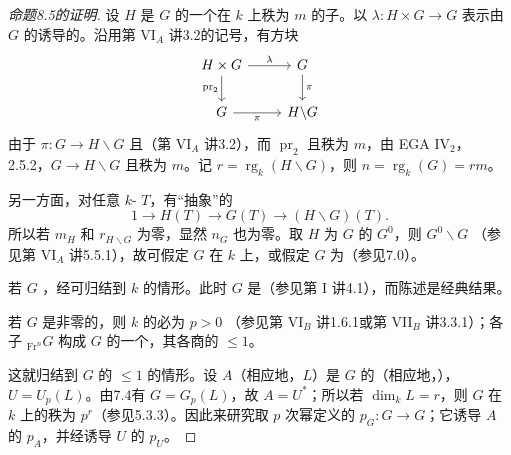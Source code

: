 \begin{proof}[命题8.5的证明]
设 $H$ 是 $G$ 的一个在 $k$ 上秩为 $m$ 的子。以 $\lambda:H\times G\to G$ 表示由 $G$ 的诱导的。沿用第 VI$_A$ 讲3.2的记号，有方块
\[
\begin{tikzcd}
 H\times G\arrow[r,"\lambda"]\arrow[d,"\operatorname{pr}_2"']&G\arrow[d,"\pi"]\\
 G\arrow[r,"\pi"']&H\backslash G
\end{tikzcd}
\]
由于 $\pi:G\to H\backslash G$ 且（第 VI$_A$ 讲3.2），而 $\operatorname{pr}_2$ 且秩为 $m$，由 EGA IV$_2$，2.5.2，$G\to H\backslash G$ 且秩为 $m$。记 $r=\operatorname{rg}_k(H\backslash G)$，则 $n=\operatorname{rg}_k(G)=rm$。

另一方面，对任意 $k$- $T$，有“抽象”的
\[
 1\longrightarrow H(T)\longrightarrow G(T)\longrightarrow(H\backslash G)(T).
\]
所以若 $m_H$ 和 $r_{H\backslash G}$ 为零，显然 $n_G$ 也为零。取 $H$ 为 $G$ 的 $G^0$，则 $G^0\backslash G$ （参见第 VI$_A$ 讲5.5.1），故可假定 $G$ 在 $k$ 上，或假定 $G$ 为（参见7.0）。

若 $G$ ，经可归结到 $k$ 的情形。此时 $G$ 是（参见第 I 讲4.1），而陈述是经典结果。

若 $G$ 是非零的，则 $k$ 的必为 $p>0$
（参见第 VI$_B$ 讲1.6.1或第 VII$_B$ 讲3.3.1）；各子 ${}_{\operatorname{Fr}^n}G$ 构成 $G$ 的一个，其各商的 $\le1$。

这就归结到 $G$ 的 $\le1$ 的情形。设 $A$（相应地，$L$）是 $G$ 的（相应地，），$U=U_p(L)$。由7.4有 $G=G_p(L)$，故 $A=U^*$；所以若 $\dim_kL=r$，则 $G$ 在 $k$ 上的秩为 $p^r$（参见5.3.3）。因此来研究取 $p$ 次幂定义的 $p_G:G\to G$；它诱导 $A$ 的 $p_A$，并经诱导 $U$ 的 $p_U$。


\end{proof}
